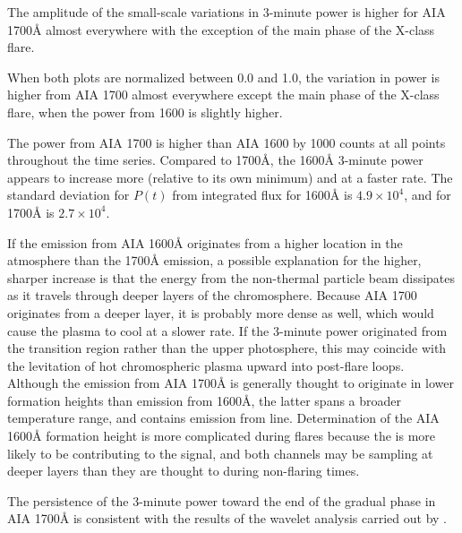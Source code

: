 The amplitude of the small-scale variations in 3-minute
power is higher for AIA 1700\AA{} almost everywhere with
the exception of the main phase of the X-class flare.


When both plots are normalized between 0.0 and 1.0, the variation in
power is higher from AIA 1700 almost everywhere except the main phase of the
X-class flare, when the power from 1600 is slightly higher.

The power from AIA 1700 is higher than AIA 1600 by
1000 counts at all points throughout the time series.
Compared to 1700\AA{},
the 1600\AA{} 3-minute power appears to increase more
(relative to its own minimum) and at a faster rate.
The standard deviation for $P(t)$ from integrated flux
for 1600\AA{} is $4.9 \times 10^{4}$, and
for 1700\AA{} is $2.7 \times 10^{4}$.

If the emission from AIA 1600\AA{}
originates from a higher location in the atmosphere
than the 1700\AA{} emission,
a possible explanation for the higher, sharper increase
is that the energy from the non-thermal particle beam
dissipates as it travels through deeper layers of the chromosphere.
Because AIA 1700 originates from a deeper layer, it is probably more dense
as well, which would cause the plasma to cool at a slower rate.
If the 3-minute power originated from the transition region rather than the
upper photosphere, this may coincide with the levitation of hot chromospheric
plasma upward into post-flare loops.
Although the emission from AIA 1700\AA{} is generally thought to originate
in lower formation heights than emission from 1600\AA{},
the latter spans a broader temperature range, and contains
emission from  line.
Determination of the AIA 1600\AA{} formation height is more complicated
during flares because the  is more likely to be contributing
to the signal, and both channels may be sampling at deeper layers than
they are thought to during non-flaring times.

The persistence of the 3-minute power toward the end of the gradual phase
in AIA 1700\AA{} is consistent with the results of the wavelet analysis
carried out by \cite{Milligan2017}.

